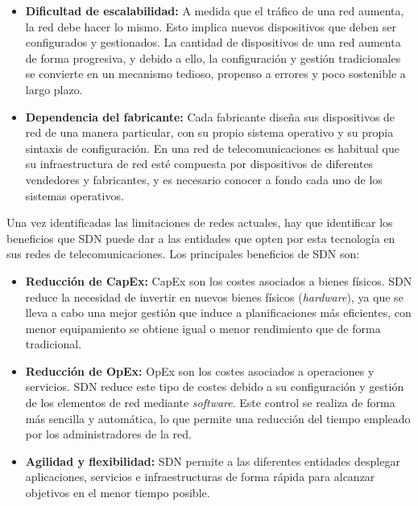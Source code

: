 \begin{itemize}
	\item \textbf{Dificultad de escalabilidad:} A medida que el tráfico de una red aumenta, la red debe hacer lo mismo. Esto implica nuevos dispositivos que deben ser configurados y gestionados. La cantidad de dispositivos de una red aumenta de forma progresiva, y debido a ello, la configuración y gestión tradicionales se convierte en un mecanismo tedioso, propenso a errores y poco sostenible a largo plazo.
	
	\item \textbf{Dependencia del fabricante:} Cada fabricante diseña sus dispositivos de red de una manera particular, con su propio sistema operativo y su propia sintaxis de configuración. En una red de telecomunicaciones es habitual que su infraestructura de red esté compuesta por dispositivos de diferentes vendedores y fabricantes, y es necesario conocer a fondo cada uno de los sistemas operativos.
	
\end{itemize}

Una vez identificadas las limitaciones de redes actuales, hay que identificar los beneficios que SDN puede dar a las entidades que opten por esta tecnología en sus redes de telecomunicaciones. Los principales beneficios de \ac{SDN} son:

\begin{itemize}
	\item \textbf{Reducción de \ac{CapEx}:} \ac{CapEx} son los costes asociados a bienes físicos. SDN reduce la necesidad de invertir en nuevos bienes físicos (\textit{hardware}), ya que se lleva a cabo una mejor gestión que induce a planificaciones más eficientes, con menor equipamiento se obtiene igual o menor rendimiento que de forma tradicional.
	
	\item \textbf{Reducción de \ac{OpEx}:} \ac{OpEx} son los costes asociados a operaciones y servicios. SDN reduce este tipo de costes debido a su configuración y gestión de los elementos de red mediante \textit{software}. Este control se realiza de forma más sencilla y automática, lo que permite una reducción del tiempo empleado por los administradores de la red.
	
	\item \textbf{Agilidad y flexibilidad:} \ac{SDN} permite a las diferentes entidades desplegar aplicaciones, servicios e infraestructuras de forma rápida para alcanzar objetivos en el menor tiempo posible.
\end{itemize}

